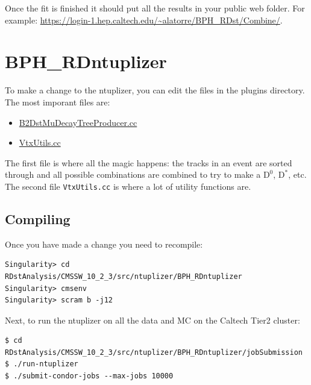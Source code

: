 \documentclass[12pt]{report}
\begin{document}
Once the fit is finished it should put all the results in your public web
folder. For example:
\url{https://login-1.hep.caltech.edu/~alatorre/BPH_RDst/Combine/}.

\section{BPH\_RDntuplizer}
To make a change to the ntuplizer, you can edit the files in the plugins directory. The most imporant files are:
\begin{itemize}
\item \href{https://github.com/alatorre-caltech/BPH_RDntuplizer/blob/master/plugins/B2DstMuDecayTreeProducer.cc}{B2DstMuDecayTreeProducer.cc}
\item \href{https://github.com/alatorre-caltech/BPH_RDntuplizer/blob/master/plugins/VtxUtils.cc}{VtxUtils.cc}
\end{itemize}
The first file is where all the magic happens: the tracks in an event are
sorted through and all possible combinations are combined to try to make a
$\mathrm{D}^0$, $\mathrm{D}^*$, etc. The second file \texttt{VtxUtils.cc} is
where a lot of utility functions are.
\subsection{Compiling}
Once you have made a change you need to recompile:
\begin{mdframed}[backgroundcolor=light-gray, roundcorner=10pt,leftmargin=1, rightmargin=1, innerleftmargin=15, innertopmargin=15,innerbottommargin=15, outerlinewidth=1, linecolor=light-gray,roundcorner=20pt]
\begin{lstlisting}
Singularity> cd RDstAnalysis/CMSSW_10_2_3/src/ntuplizer/BPH_RDntuplizer
Singularity> cmsenv
Singularity> scram b -j12
\end{lstlisting}
\end{mdframed}

Next, to run the ntuplizer on all the data and MC on the Caltech Tier2 cluster:
\begin{mdframed}[backgroundcolor=light-gray, roundcorner=10pt,leftmargin=1, rightmargin=1, innerleftmargin=15, innertopmargin=15,innerbottommargin=15, outerlinewidth=1, linecolor=light-gray,roundcorner=20pt]
\begin{lstlisting}
$ cd RDstAnalysis/CMSSW_10_2_3/src/ntuplizer/BPH_RDntuplizer/jobSubmission
$ ./run-ntuplizer
$ ./submit-condor-jobs --max-jobs 10000
\end{lstlisting}
\end{mdframed}
\end{document}
